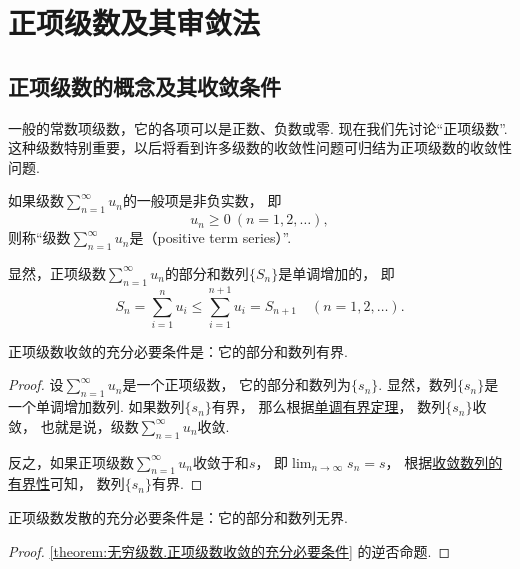 \section{正项级数及其审敛法}
\subsection{正项级数的概念及其收敛条件}
一般的常数项级数，它的各项可以是正数、负数或零.
现在我们先讨论“正项级数”.
这种级数特别重要，以后将看到许多级数的收敛性问题可归结为正项级数的收敛性问题.

\begin{definition}
如果级数\(\sum_{n=1}^\infty u_n\)的一般项是非负实数，
即\[
	u_n\geq0\ (n=1,2,\dotsc),
\]
则称“级数\(\sum_{n=1}^\infty u_n\)是（positive term series）”.
\end{definition}

显然，正项级数\(\sum_{n=1}^\infty u_n\)的部分和数列\(\{S_n\}\)是单调增加的，
即\[
	S_n = \sum_{i=1}^n u_i
	\leq \sum_{i=1}^{n+1} u_i
	= S_{n+1}
	\quad(n=1,2,\dotsc).
\]

\begin{theorem}\label{theorem:无穷级数.正项级数收敛的充分必要条件}
正项级数收敛的充分必要条件是：它的部分和数列有界.
\begin{proof}
设\(\sum_{n=1}^\infty u_n\)是一个正项级数，
它的部分和数列为\(\{s_n\}\).
显然，数列\(\{s_n\}\)是一个单调增加数列.
如果数列\(\{s_n\}\)有界，
那么根据\hyperref[theorem:极限.数列的单调有界定理]{单调有界定理}，
数列\(\{s_n\}\)收敛，
也就是说，级数\(\sum_{n=1}^\infty u_n\)收敛.

反之，如果正项级数\(\sum_{n=1}^\infty u_n\)收敛于和\(s\)，
即\(\lim_{n\to\infty} s_n = s\)，
根据\hyperref[theorem:极限.收敛数列的有界性]{收敛数列的有界性}可知，
数列\(\{s_n\}\)有界.
\end{proof}
\end{theorem}

\begin{proposition}
正项级数发散的充分必要条件是：它的部分和数列无界.
\begin{proof}
\cref{theorem:无穷级数.正项级数收敛的充分必要条件} 的逆否命题.
\end{proof}
\end{proposition}

